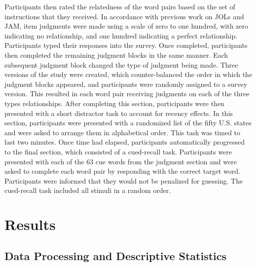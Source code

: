 \documentclass[english,man]{apa6}
\theoremstyle{definition}
\theoremstyle{definition}
\theoremstyle{definition}
\theoremstyle{remark}
\begin{document}
Participants then rated the relatedness of the word pairs based on the
set of instructions that they received. In accordance with previous work
on JOLs and JAM, item judgments were made using a scale of zero to one
hundred, with zero indicating no relationship, and one hundred
indicating a perfect relationship. Participants typed their responses
into the survey. Once completed, participants then completed the
remaining judgment blocks in the same manner. Each subsequent judgment
block changed the type of judgment being made. Three versions of the
study were created, which counter-balanced the order in which the
judgment blocks appeared, and participants were randomly assigned to a
survey version. This resulted in each word pair receiving judgments on
each of the three types relationships. After completing this section,
participants were then presented with a short distractor task to account
for recency effects. In this section, participants were presented with a
randomized list of the fifty U.S. states and were asked to arrange them
in alphabetical order. This task was timed to last two minutes. Once
time had elapsed, participants automatically progressed to the final
section, which consisted of a cued-recall task. Participants were
presented with each of the 63 cue words from the judgment section and
were asked to complete each word pair by responding with the correct
target word. Participants were informed that they would not be penalized
for guessing. The cued-recall task included all stimuli in a random
order.

\section{Results}\label{results}

\subsection{Data Processing and Descriptive
Statistics}\label{data-processing-and-descriptive-statistics}
\end{document}
